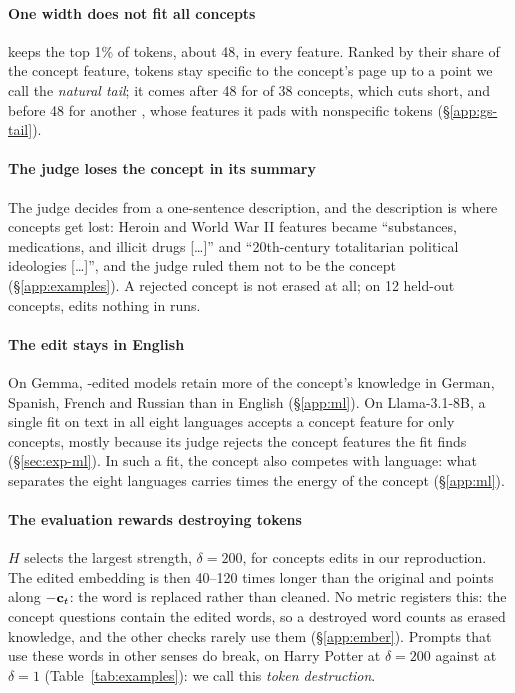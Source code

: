 \paragraph{One width does not fit all concepts}
\ember{} keeps the top 1\% of tokens, about 48, in every feature.
Ranked by their share of the concept feature, tokens stay specific to the concept's page up to a point we call the \emph{natural tail}; it comes after 48 for  of 38 concepts, which \ember{} cuts short, and before 48 for another , whose features it pads with nonspecific tokens (\S\ref{app:gs-tail}).

\paragraph{The judge loses the concept in its summary}
The judge decides from a one-sentence description, and the description is where concepts get lost: Heroin and World War II features became ``substances, medications, and illicit drugs [\dots]'' and ``20th-century totalitarian political ideologies [\dots]'', and the judge ruled them not to be the concept (\S\ref{app:examples}).
A rejected concept is not erased at all; on 12 held-out concepts, \ember{} edits nothing in  runs.

\paragraph{The edit stays in English}
On Gemma, \ember{}-edited models retain  more of the concept's knowledge in German, Spanish, French and Russian than in English (\S\ref{app:ml}).
On Llama-3.1-8B, a single \ember{} fit on text in all eight languages accepts a concept feature for only  concepts, mostly because its judge rejects the concept features the fit finds (\S\ref{sec:exp-ml}).
In such a fit, the concept also competes with language: what separates the eight languages carries  times the energy of the concept (\S\ref{app:ml}).

\paragraph{The evaluation rewards destroying tokens}
$H$ selects the largest strength, $\delta = 200$, for  concepts \ember{} edits in our reproduction.
The edited embedding is then 40--120 times longer than the original and points along $-\mathbf{c}_t$: the word is replaced rather than cleaned.
No metric registers this: the concept questions contain the edited words, so a destroyed word counts as erased knowledge, and the other checks rarely use them (\S\ref{app:ember}).
Prompts that use these words in other senses do break,  on Harry Potter at $\delta = 200$ against  at $\delta = 1$ (Table~\ref{tab:examples}): we call this \emph{token destruction}.
